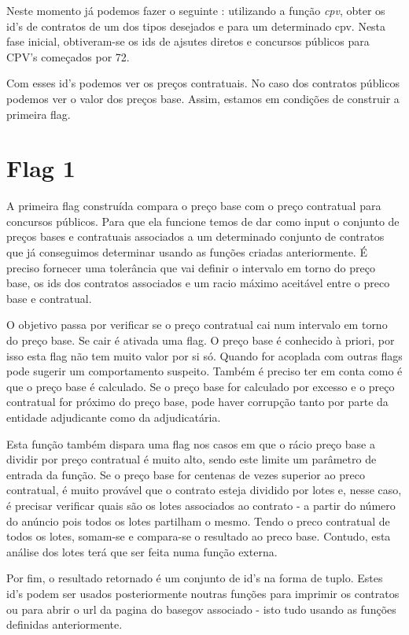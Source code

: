 Neste momento já podemos fazer o seguinte : utilizando a função \textit{cpv}, obter os id's de contratos de um dos tipos desejados e para um determinado cpv. Nesta fase inicial, obtiveram-se os ids de ajsutes diretos e concursos públicos para CPV's começados por 72. 

Com esses id's podemos ver os preços contratuais. No caso dos contratos públicos podemos ver o valor dos preços base. Assim, estamos em condições de construir a primeira flag. 

\section{Flag 1}

A primeira flag construída compara o preço base com o preço contratual para concursos públicos. Para que ela funcione temos de dar como input o conjunto de preços bases e contratuais associados a um determinado conjunto de contratos que já conseguimos determinar usando as funções criadas anteriormente. É preciso fornecer uma tolerância que vai definir o intervalo em torno do preço base, os ids dos contratos associados e um racio máximo aceitável entre o preco base e contratual. 


O objetivo passa por verificar se o preço contratual cai num intervalo em torno do preço base. Se cair é ativada uma flag. O preço base é conhecido à priori, por isso esta flag não tem muito valor por si só. Quando for acoplada com outras flags pode sugerir um comportamento suspeito. Também é preciso ter em conta como é que o preço base é calculado. Se o preço base for calculado por excesso e o preço contratual for próximo do preço base, pode haver corrupção tanto por parte da entidade adjudicante como da adjudicatária. 

Esta função também dispara uma flag nos casos em que o rácio preço base a dividir por preço contratual é muito alto, sendo este limite um parâmetro de entrada da função. Se o preço base for centenas de vezes superior ao preco contratual, é muito provável que o contrato esteja dividido por lotes e, nesse caso, é precisar verificar quais são os lotes associados ao contrato - a partir do número do anúncio pois todos os lotes partilham o mesmo. Tendo o preco contratual de todos os lotes, somam-se e compara-se o resultado ao preco base. Contudo, esta análise dos lotes terá que ser feita numa função externa.  

Por fim, o resultado retornado é um conjunto de id's na forma de tuplo. Estes id's podem ser usados posteriormente noutras funções para imprimir os contratos ou para abrir o url da pagina do basegov associado - isto tudo usando as funções definidas anteriormente. 

